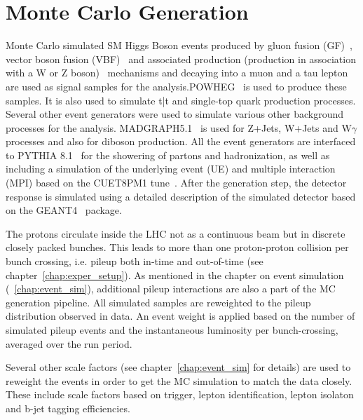 \section{Monte Carlo Generation}
\label{mc_gen}

Monte Carlo simulated SM Higgs Boson events produced by  gluon fusion (GF)~\cite{Georgi_GF}, vector boson fusion (VBF)~\cite{Cahn:1986zv} and associated production (production in association with a W or Z boson)~\cite{Glashow:1978ab} mechanisms and decaying into a muon and a tau lepton are used as signal samples for the analysis.POWHEG~\cite{Nason:2004rx,Frixione:2007vw, Alioli:2010xd, Alioli:2010xa, Alioli:2008tz, Bagnaschi:2011tu} is used to produce these samples. It is also used to simulate t\bar{t} and single-top quark production processes. Several other event generators were used to simulate various other background processes for the analysis. MADGRAPH5.1~\cite{Alwall:2011uj} is used for Z+Jets, W+Jets and W$\gamma$ processes and also for diboson production. All the event generators are interfaced to PYTHIA 8.1~\cite{Sjostrand:pythia8} for the showering of partons and hadronization, as well as including a simulation of the underlying event (UE) and multiple interaction (MPI) based on the CUET8PM1 tune~\cite{Khachatryan:2015pea}. After the generation step, the detector response is simulated using a detailed description of the simulated detector based on the GEANT4~\cite{GEANT4} package.

The protons circulate inside the LHC not as a continuous beam but in discrete closely packed bunches. This leads to more than one proton-proton collision per bunch crossing, i.e. pileup both in-time and out-of-time (see chapter~\ref{chap:exper_setup}). As mentioned in the chapter on event simulation (~\ref{chap:event_sim}), additional pileup interactions are also a part of the MC generation pipeline. All simulated samples are reweighted to the pileup distribution observed in data. An event weight is applied based on the number of simulated pileup events and the instantaneous luminosity per bunch-crossing, averaged over the run period.

Several other scale factors (see chapter~\ref{chap:event_sim} for details) are used to reweight the events in order to get the MC simulation to match the data closely. These include scale factors based on trigger, lepton identification, lepton isolaton and b-jet tagging efficiencies.



%
% 
% 

%
% 
% 
